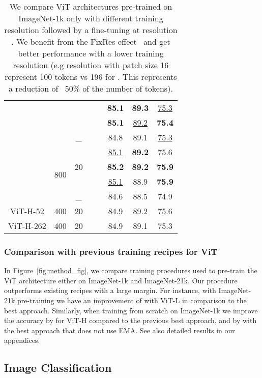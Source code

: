 \begin{table}[]
{\begin{tabular}{c|cc|cc|ccc}
        & & & &  & \textbf{85.1} & \textbf{89.3} & \underline{75.3} \\ & & &   &  & \textbf{85.1} & \underline{89.2} & \textbf{75.4}  \\
        & & \_  &  &  & 84.8 & 89.1 & \underline{75.3} \\
         \cmidrule{2-8}
        &\multirow{4}{*}{800} & \multirow{3}{*}{20} &
        & \multirow{4}{*}{} & \underline{85.1} & \textbf{89.2}  & 75.6 \\& & & &  & \textbf{85.2} & \textbf{89.2} & \textbf{75.9} \\ & & &   & & \underline{85.1}  & 88.9 & \textbf{75.9} \\ & & \_  &  & & 84.6 & 88.5  & 74.9 \\    
        \midrule
        ViT-H-52 & 400 & 20 &  &  & 84.9 & 89.2 & 75.6\\
        \midrule
        ViT-H-262 & 400 & 20 &  &  & 84.9 & 89.1 & 75.3 \\
    \bottomrule
    \end{tabular}}
    \caption{We compare ViT architectures pre-trained on ImageNet-1k only with different training resolution followed by a fine-tuning at resolution . We benefit from the FixRes effect~\cite{Touvron2019FixRes} and get better performance with a lower training resolution (e.g resolution  with patch size 16 represent 100 tokens vs 196 for . This represents a reduction of ~50\% of the number of tokens).}
    \label{tab:fixRes}
\end{table}


\subsubsection{Comparison with previous training recipes for ViT}
In Figure~\ref{fig:method_fig}, we compare training procedures used to pre-train the ViT architecture either on ImageNet-1k and ImageNet-21k.
Our procedure outperforms existing recipes with a large margin. For instance, with ImageNet-21k pre-training we have an improvement of  with ViT-L in comparison to the best approach.
Similarly, when training from scratch on ImageNet-1k we improve the accuracy by  for ViT-H  compared to the previous best approach, and by  with the best approach that does not use EMA. See also detailed results in our appendices. 


\subsection{Image Classification}

